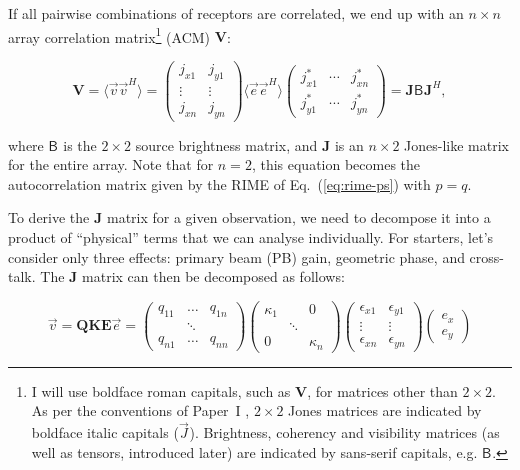 \documentclass{aa}
\newcommand{\herm}{H}
\newcommand{\jones}[2]{\vec {#1}_{#2}}
\newcommand{\coh}[2]{\mathsf{{#1}}_{{#2}}}
\begin{document}
If all pairwise combinations of receptors are correlated, we end up with an $n\times n$ array correlation matrix\footnote{I will use boldface roman capitals, such as $\mathbf{V}$, for matrices other than $2\times2$. As per the conventions of Paper~I \citep[][Sect.~1.4]{RRIME1}, $2\times2$ Jones matrices are indicated by boldface italic capitals ($\jones{J}{}$). Brightness, coherency and visibility matrices (as well as tensors, introduced later) are indicated by sans-serif capitals, e.g. $\coh{B}{}$.} (ACM) $\mathbf{V}$:

\begin{equation}\label{eq:array-response-j}
\mathbf{V} =\langle \vec v \vec v^\herm \rangle =\left(\begin{array}{cc}
j_{x1} & j_{y1}\\
\vdots & \vdots\\
j_{xn} & j_{yn}\end{array}\right) \langle \vec e \vec e^\herm \rangle \left(\begin{array}{ccc}
j^*_{x1} & \cdots & j^*_{xn}\\
j^*_{y1} & \cdots & j^*_{yn}\end{array}\right)= \mathbf{J} \coh{B}{} \mathbf{J}^\herm,
\end{equation}

where $\coh{B}{}$ is the $2\times2$ source brightness matrix, and $\mathbf{J}$ is an $n\times2$ Jones-like matrix for the entire array. Note that for $n=2$, this equation becomes the autocorrelation matrix given by the RIME of Eq.~(\ref{eq:rime-ps}) with $p=q$.

To derive the $\mathbf{J}$ matrix for a given observation, we need to decompose it into a product of ``physical'' terms that we can
analyse individually. For starters, let's consider only three effects: primary beam (PB) gain, geometric phase, and cross-talk. The 
$\mathbf{J}$ matrix can then be decomposed as follows:

\begin{equation}\label{eq:array-response}
\vec v = \mathbf{QKE} \vec e =\left(\begin{array}{ccc}
q_{11} & \ldots & q_{1n}\\
 & \ddots\\
q_{n1} & \ldots & q_{nn}\end{array}\right)\left(\begin{array}{ccc}
\kappa_{1} &  & 0\\
 & \ddots & \\
0 &  & \kappa_{n}\end{array}\right)\left(\begin{array}{cc}
\epsilon_{x1} & \epsilon_{y1}\\
\vdots & \vdots\\
\epsilon_{xn} & \epsilon_{yn}\end{array}\right) 
\left(\begin{array}{c} e_x\\e_y
\end{array}\right)
\end{equation}
\end{document}
